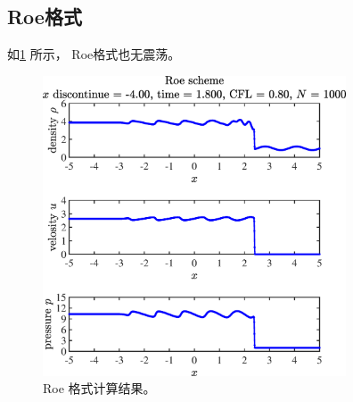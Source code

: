 \documentclass[12pt]{article}
\begin{document}
\subsection{Roe格式}

如\cref{fig:4Roe} 所示， Roe格式也无震荡。


\begin{figure}[htp]
	\centering
	\includegraphics[width=9cm]{4Roe.eps}
	\vspace{20pt}
	\caption{Roe 格式计算结果。}
	\label{fig:4Roe}
\end{figure}














\end{document}
